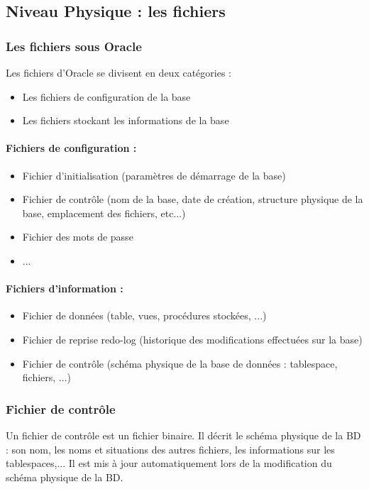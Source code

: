\documentclass[10pt,a4paper,twoside]{article}
\begin{document}
\subsection{Niveau Physique : les fichiers}
\subsubsection{Les fichiers sous Oracle}
Les fichiers d'Oracle se divisent en deux catégories :
\begin{itemize}
\item Les fichiers de configuration de la base
\item Les fichiers stockant les informations de la base 
\end{itemize}

\paragraph{Fichiers de configuration :}
\begin{itemize}
\item Fichier d'initialisation (paramètres de démarrage de la base)
\item Fichier de contrôle (nom de la base, date de création, structure physique de la base, emplacement des fichiers, etc...)
\item Fichier des mots de passe
\item ...
\end{itemize}

\paragraph{Fichiers d'information :}
\begin{itemize}
\item Fichier de données (table, vues, procédures stockées, ...)
\item Fichier de reprise redo-log (historique des modifications effectuées sur la base)
\item Fichier de contrôle (schéma physique de la base de données : tablespace, fichiers, ...)
\end{itemize}

\subsubsection{Fichier de contrôle}
Un fichier de contrôle est un fichier binaire. Il décrit le schéma physique de la BD : son nom, les noms et situations des autres fichiers, les informations sur les tablespaces,... Il est mis à jour automatiquement lors de la modification du schéma physique de la BD.
\end{document}
